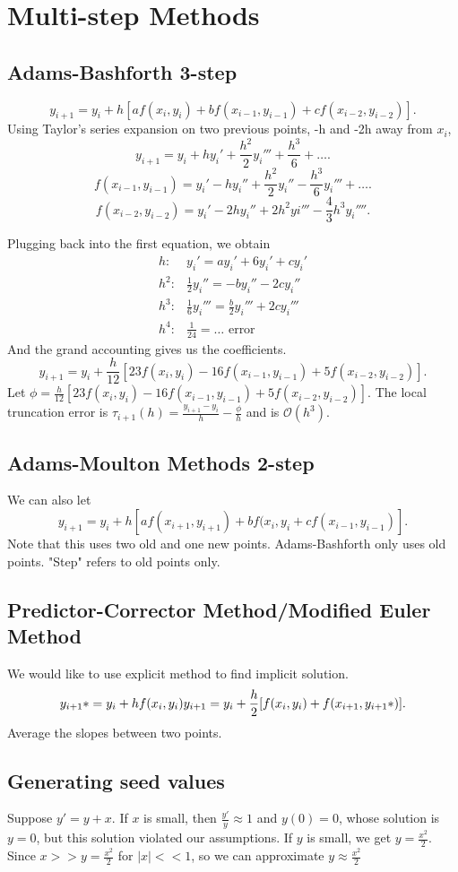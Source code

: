 \documentclass[class=article, crop=false]{standalone}
\theoremstyle{plain}
\theoremstyle{remark}
\begin{document}
\section{Multi-step Methods}
\subsection{Adams-Bashforth 3-step}
\[
	y_{i+1} = y_i + h [a f(x_{i},y_{i})+b f(x_{i-1},y_{i-1}) +c f(x_{i-2},y_{i-2})]   
.\] 
Using Taylor's series expansion on two previous points, -h and -2h away from $x_{i}$,
\[
y_{i+1} = y_i + h y_{i}' +\frac{h^2}{2} y_{i}''' + \frac{h^3}{6} + \ldots
.\] 
\[
	f(x_{i-1},y_{i-1}) = y_{i}' - h y_{i}'' + \frac{h^2}{2} y_{i}'' - \frac{h^3}{6} y_{i}'''+\ldots
.\]
\[
	f(x_{i-2},y_{i-2}) = y_{i}'-2h y_{i}'' + 2h^2 yi''' -\frac{4}{3}h^3 y_{i}''''
.\] 

Plugging back into the first equation, we obtain
\begin{equation*}
\begin{split}
	h:& y_{i}'=a y_{i}'+6y_{i}'+cy_{i}'\\
	h^2:& \frac{1}{2}y_{i}'' = -b y_{i}''-2 c y_{i}''\\
	h^3:& \frac{1}{6}y_{i}''' = \frac{b}{2}y_{i}'''+ 2c y_{i}'''\\
	h^4:& \frac{1}{24} = \ldots \text{ error}  
\end{split}
\end{equation*}
And the grand accounting gives us the coefficients.
\[
	y_{i+1} = y_{i} + \frac{h}{12}[23f(x_{i},y_{i})-16 f(x_{i-1},y_{i-1}) +5 f(x_{i-2},y_{i-2})]  
.\] 
Let $\phi =  \frac{h}{12}[23f(x_{i},y_{i})-16 f(x_{i-1},y_{i-1}) +5 f(x_{i-2},y_{i-2})]   $.
The local truncation error is $\tau_{i+1}(h) = \frac{y_{i+1}-y_{i}}{h} - \frac{\phi}{h}$ and is $\mathcal{O}(h^3) $.

\subsection{Adams-Moulton Methods 2-step}
We can also let
\[
	y_{i+1} = y_{i} + h [a f(x_{i+1},y_{i+1}) + b f(x_{i},y_{i} + c f(x_{i-1},y_{i-1}) ]
.\]
Note that this uses two old and one new points. Adams-Bashforth only uses old points. "Step" refers to old points only.

\subsection{Predictor-Corrector Method/Modified Euler Method}
We would like to use explicit method to find implicit solution.
\[
	y_{i+1}* = y_{i} + h f(x_{i},y_{i}) \\ 
	y_{i+1} = y_{i} + \frac{h}{2} [f(x_{i},y_{i})+f(x_{i+1},y_{i+1}*)] 
.\] 
Average the slopes between two points.

\subsection{Generating seed values}
Suppose $y'=y+x$. If  $x$ is small, then $\frac{y'}{y} \approx 1$ and $y(0)=0$, whose solution is $y=0$, but this solution violated our assumptions.
If $y$ is small, we get $y = \frac{x^2}{2}$. Since $x>> y=\frac{x^2}{2}$ for $|x|<<1$, so we can approximate  $y \approx \frac{x^2}{2}$
\end{document}

